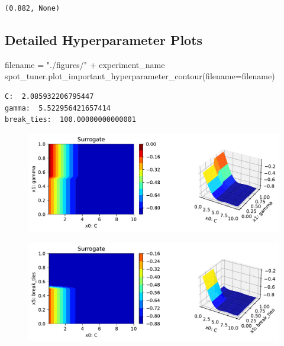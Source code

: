 \documentclass[
  letterpaper,
  DIV=11,
  numbers=noendperiod]{scrreprt}
\newenvironment{Shaded}{\begin{snugshade}}{\end{snugshade}}
\newcommand{\NormalTok}[1]{\textcolor[rgb]{0.00,0.23,0.31}{#1}}
\newcommand{\OperatorTok}[1]{\textcolor[rgb]{0.37,0.37,0.37}{#1}}
\newcommand{\StringTok}[1]{\textcolor[rgb]{0.13,0.47,0.30}{#1}}
\begin{document}
\begin{verbatim}
(0.882, None)
\end{verbatim}

\hypertarget{detailed-hyperparameter-plots-5}{%
\subsection{Detailed Hyperparameter
Plots}\label{detailed-hyperparameter-plots-5}}

\begin{Shaded}
\begin{Highlighting}[]
\NormalTok{filename }\OperatorTok{=} \StringTok{"./figures/"} \OperatorTok{+}\NormalTok{ experiment\_name}
\NormalTok{spot\_tuner.plot\_important\_hyperparameter\_contour(filename}\OperatorTok{=}\NormalTok{filename)}
\end{Highlighting}
\end{Shaded}

\begin{verbatim}
C:  2.085932206795447
gamma:  5.522956421657414
break_ties:  100.00000000000001
\end{verbatim}

\begin{figure}[H]

{\centering \includegraphics{18_spot_hpt_sklearn_multiclass_classification_svc_files/figure-pdf/cell-47-output-2.pdf}

}

\end{figure}

\begin{figure}[H]

{\centering \includegraphics{18_spot_hpt_sklearn_multiclass_classification_svc_files/figure-pdf/cell-47-output-3.pdf}

}

\end{figure}
\end{document}

